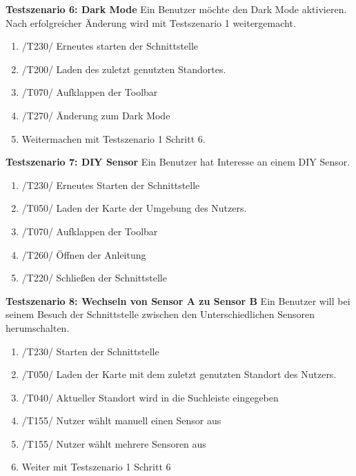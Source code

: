 \textbf{Testszenario 6: Dark Mode}
\newline
Ein Benutzer möchte den Dark Mode aktivieren. Nach erfolgreicher Änderung wird mit Testszenario 1 weitergemacht.
\begin{enumerate} [noitemsep]
    \item /T230/ Erneutes starten der Schnittstelle
    \item /T200/ Laden des zuletzt genutzten Standortes.
    \item /T070/ Aufklappen der Toolbar
    \item /T270/ Änderung zum Dark Mode
    \item Weitermachen mit Testszenario 1 Schritt 6.
\end{enumerate}

\textbf{Testszenario 7: DIY Sensor}
\newline
Ein Benutzer hat Interesse an einem DIY Sensor.
\begin{enumerate} [noitemsep]
    \item /T230/ Erneutes Starten der Schnittstelle
    \item /T050/ Laden der Karte der Umgebung des Nutzers.
    \item /T070/ Aufklappen der Toolbar
    \item /T260/ Öffnen der Anleitung
    \item /T220/ Schließen der Schnittstelle
\end{enumerate}

\textbf{Testszenario 8: Wechseln von Sensor A zu Sensor B}
\newline
Ein Benutzer will bei seinem Besuch der Schnittstelle zwischen den Unterschiedlichen Sensoren herumschalten. 
\begin{enumerate} [noitemsep]
    \item /T230/ Starten der Schnittstelle
    \item /T050/ Laden der Karte mit dem zuletzt genutzten Standort des Nutzers.
    \item /T040/ Aktueller Standort wird in die Suchleiste eingegeben
    \item /T155/ Nutzer wählt manuell einen Sensor aus 
    \item /T155/ Nutzer wählt mehrere Sensoren aus
    \item Weiter mit Testszenario 1 Schritt 6
\end{enumerate}

